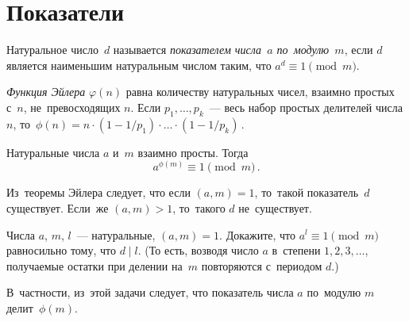 
\section*{Показатели}


Натуральное число~$d$ называется \emph{показателем числа~$a$ по~модулю~$m$},
если $d$ является наименьшим натуральным числом таким, что
$a^d \equiv 1 \pmod{m}$. 

\emph{Функция Эйлера} $\varphi(n)$ равна количеству натуральных чисел, взаимно
простых с~$n$, не~превосходящих $n$.
Если $p_1, \ldots, p_k$~--- весь набор простых делителей числа $n$,
то~\(
    \phi(n)
=
    n \cdot (1 - 1 / p_1)
    \cdot \ldots \cdot
    (1 - 1 / p_k)
\,.\)

Натуральные числа $a$ и~$m$ взаимно просты.
Тогда
\[
    a^{\phi(m)} \equiv 1 \pmod{m}
\,.\]

Из~теоремы Эйлера следует, что если $(a, m) = 1$, то~такой показатель~$d$
существует.
Если~же $(a, m) > 1$, то~такого $d$ не~существует.

\begin{problems}

\item
Числа $a$, $m$, $l$~--- натуральные, $(a, m) = 1$.
Докажите, что $a^l \equiv 1 \pmod{m}$ равносильно тому, что $d \mid l$.
(То есть, возводя число $a$ в~степени $1, 2, 3, \ldots$, получаемые остатки при
делении на~$m$ повторяются с~периодом $d$.)

\end{problems}

В~частности, из~этой задачи следует, что показатель числа $a$ по~модулю $m$
делит~$\phi(m)$.

